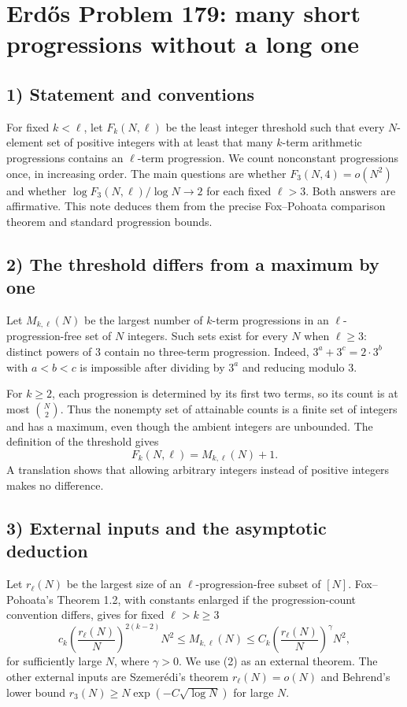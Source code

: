 \section{Erd\H{o}s Problem 179: many short progressions without a long one}

\subsection{1) Statement and conventions}
For fixed $k<\ell$, let $F_k(N,\ell)$ be the least integer threshold
such that every $N$-element set of positive integers with at least that
many $k$-term arithmetic progressions contains an $\ell$-term progression.
We count nonconstant progressions once, in increasing order. The main
questions are whether $F_3(N,4)=o(N^2)$ and whether
$\log F_3(N,\ell)/\log N\to2$ for each fixed $\ell>3$.
Both answers are affirmative. This note deduces them from the precise
Fox--Pohoata comparison theorem and standard progression bounds.

\subsection{2) The threshold differs from a maximum by one}
Let $M_{k,\ell}(N)$ be the largest number of $k$-term progressions in
an $\ell$-progression-free set of $N$ integers. Such sets exist for every
$N$ when $\ell\geq3$: distinct powers of $3$ contain no three-term
progression. Indeed, $3^a+3^c=2\cdot3^b$ with $a<b<c$ is impossible
after dividing by $3^a$ and reducing modulo $3$.

For $k\geq2$, each progression is determined by its first two terms,
so its count is at most $\binom N2$. Thus the nonempty set of attainable
counts is a finite set of integers and has a maximum, even though the
ambient integers are unbounded. The definition of the threshold gives
\[
 F_k(N,\ell)=M_{k,\ell}(N)+1.                         \tag{1}
\]
A translation shows that allowing arbitrary integers instead of positive
integers makes no difference.

\subsection{3) External inputs and the asymptotic deduction}
Let $r_\ell(N)$ be the largest size of an $\ell$-progression-free subset
of $[N]$. Fox--Pohoata's Theorem 1.2, with constants enlarged if the
progression-count convention differs, gives for fixed $\ell>k\geq3$
\[
 c_k\left(\frac{r_\ell(N)}N\right)^{2(k-2)}N^2
 \leq M_{k,\ell}(N)
 \leq C_k\left(\frac{r_\ell(N)}N\right)^\gamma N^2,       \tag{2}
\]
for sufficiently large $N$, where $\gamma>0$. We use (2) as an
external theorem. The other external inputs are Szemer\'edi's theorem
$r_\ell(N)=o(N)$ and Behrend's lower bound
$r_3(N)\geq N\exp(-C\sqrt{\log N})$ for large $N$.

